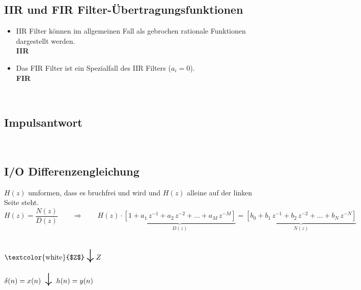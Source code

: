 	\subsection{IIR und FIR Filter-Übertragungsfunktionen}
		\begin{itemize}
		 \item IIR Filter können im allgemeinen Fall als gebrochen rationale Funktionen dargestellt werden.\\[0.2cm]
		 \textbf{IIR}$\qquad$
		 \item Das FIR Filter ist ein Spezialfall des IIR Filters ($a_i = 0$).\\[0.2cm]
		 \textbf{FIR}$\qquad$
		\end{itemize}$ $\\[-0.8cm]

	\subsection{Impulsantwort }
		$\qquad\qquad$
		\\
		
	\subsection{I/O Differenzengleichung}
		$H(z)$ umformen, dass es bruchfrei und wird und $H(z)$ alleine auf der linken Seite steht.\\[0.2cm]
		$H(z)=\dfrac{N(z)}{D(z)}\qquad\Rightarrow\qquad H(z)\cdot \underbrace{\left[1 + a_1\,z^{-1}+ a_2\,z^{-2}+ ... + a_M\,z^{-M}\right]}_{D(z)}=\underbrace{\left[b_0 + b_1\,z^{-1}+ b_2\,z^{-2}+ ... + b_N\,z^{-N}\right]}_{N(z)}$\\[0.2cm]
		\begin{center}
			\\[0.2cm] $\text{\textcolor{white}{$Z$}}\;\text{\huge$\downarrow$}\;Z$\\[0.2cm]
			\\[0.2cm]
			$\delta(n) = x(n)\;\;\text{\huge$\downarrow$}\;\;h(n) = y(n)$\\[0.2cm]
		\end{center}$ $\\[-0.7cm]
\newpage
